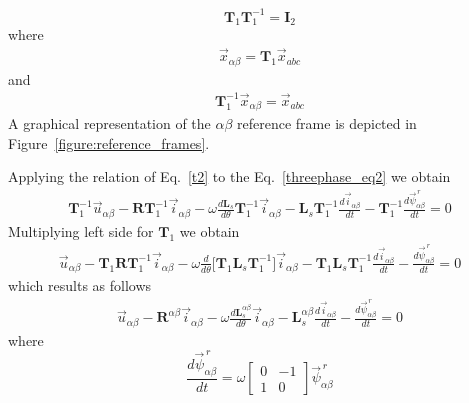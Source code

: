 \documentclass[11pt,a4paper]{article}
\numberwithin{equation}{section}
\theoremstyle{it}
\theoremstyle{definition}
\begin{document}
\begin{onehalfspace}
\begin{equation}
	\mathbf{T}_1\mathbf{T}_1^{-1} = \mathbf{I}_2
\end{equation}
where 
\begin{equation}\label{t1}
	\begin{aligned}
		\vec{x}_{\alpha\beta}=\mathbf{T}_1\vec{x}_{abc}
	\end{aligned} 
\end{equation}
and
\begin{equation}\label{t2}
	\begin{aligned}
		\mathbf{T}_1^{-1}\vec{x}_{\alpha\beta}=\vec{x}_{abc}
	\end{aligned} 
\end{equation}
A graphical representation of the $\alpha\beta$ reference frame is depicted in Figure~\ref{figure:reference_frames}.

Applying the relation of Eq.~\eqref{t2} to the Eq.~\eqref{threephase_eq2} we obtain
\begin{equation*}
	\begin{aligned}
		\mathbf{T}_1^{-1}\vec{u}_{\alpha\beta}-\mathbf{R}\mathbf{T}_1^{-1}\vec{i}_{\alpha\beta}-\omega\frac{d\mathbf{L}_s}{d\theta}\mathbf{T}_1^{-1}\vec{i}_{\alpha\beta}-\mathbf{L}_s \mathbf{T}_1^{-1}\frac{d\vec{i}_{\alpha\beta}}{dt}-\mathbf{T}_1^{-1}\frac{d\vec{\psi}^{\,r}_{\alpha\beta}}{dt} = 0
	\end{aligned} 
\end{equation*}
Multiplying left side for $\mathbf{T}_1$ we obtain
\begin{equation*}
	\begin{aligned}
		\vec{u}_{\alpha\beta}-\mathbf{T}_1\mathbf{R}\mathbf{T}_1^{-1}\vec{i}_{\alpha\beta}-\omega\frac{d}{d\theta}\Big[\mathbf{T}_1\mathbf{L}_s\mathbf{T}_1^{-1}\Big]\vec{i}_{\alpha\beta}-\mathbf{T}_1\mathbf{L}_s\mathbf{T}_1^{-1}\frac{d\vec{i}_{\alpha\beta}}{dt}-\frac{d\vec{\psi}^{\,r}_{\alpha\beta}}{dt} = 0
	\end{aligned} 
\end{equation*}
which results as follows
\begin{equation}
	\begin{aligned}
		\vec{u}_{\alpha\beta}-\mathbf{R}^{\alpha\beta}\vec{i}_{\alpha\beta}-\omega\frac{d\mathbf{L}_s^{\alpha\beta}}{d\theta}\vec{i}_{\alpha\beta}-\mathbf{L}_s^{\alpha\beta}\frac{d\vec{i}_{\alpha\beta}}{dt}-\frac{d\vec{\psi}^{\,r}_{\alpha\beta}}{dt} = 0
	\end{aligned} 
\end{equation}
where $$\frac{d\vec{\psi}^{\,r}_{\alpha\beta}}{dt} = \omega \begin{bmatrix} 0 & -1 \\ 1 & 0\end{bmatrix} \vec{\psi}^{\,r}_{\alpha\beta}$$

\end{onehalfspace}
\end{document}
